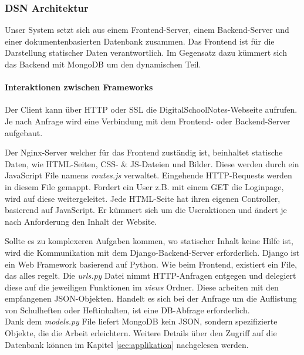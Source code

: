 
\newpage

\subsubsection{DSN Architektur}
Unser System setzt sich aus einem Frontend-Server, einem Backend-Server und einer dokumentenbasierten Datenbank zusammen. Das Frontend ist für die Darstellung statischer Daten verantwortlich. Im Gegensatz dazu kümmert sich das Backend mit MongoDB um den dynamischen Teil.
\paragraph{Interaktionen zwischen Frameworks}

Der Client kann über HTTP oder SSL die DigitalSchoolNotes-Webseite aufrufen. Je nach Anfrage wird eine Verbindung mit dem Frontend- oder Backend-Server aufgebaut.

Der Nginx-Server welcher für das Frontend zuständig ist, beinhaltet statische Daten, wie HTML-Seiten, CSS- \& JS-Dateien und Bilder. Diese werden durch ein JavaScript File namens \textit{routes.js} verwaltet. Eingehende HTTP-Requests werden in diesem File gemappt. Fordert ein User z.B. mit einem GET die Loginpage, wird auf diese weitergeleitet. Jede HTML-Seite hat ihren eigenen Controller, basierend auf JavaScript. Er kümmert sich um die Useraktionen und ändert je nach Anforderung den Inhalt der Website.


Sollte es zu komplexeren Aufgaben kommen, wo statischer Inhalt keine Hilfe ist, wird die Kommunikation mit dem Django-Backend-Server erforderlich. Django ist ein Web Framework basierend auf Python. Wie beim Frontend, existiert ein File, das alles regelt. Die \textit{urls.py} Datei nimmt HTTP-Anfragen entgegen und delegiert diese auf die jeweiligen Funktionen im \textit{views} Ordner. Diese arbeiten mit den empfangenen JSON-Objekten. Handelt es sich bei der Anfrage um die Auflistung von Schulheften oder Heftinhalten, ist eine DB-Abfrage erforderlich.\\
Dank dem \textit{models.py} File liefert MongoDB kein JSON, sondern spezifizierte Objekte, die die Arbeit erleichtern. Weitere Details über den Zugriff auf die Datenbank können im Kapitel \ref{sec:applikation} nachgelesen werden.


